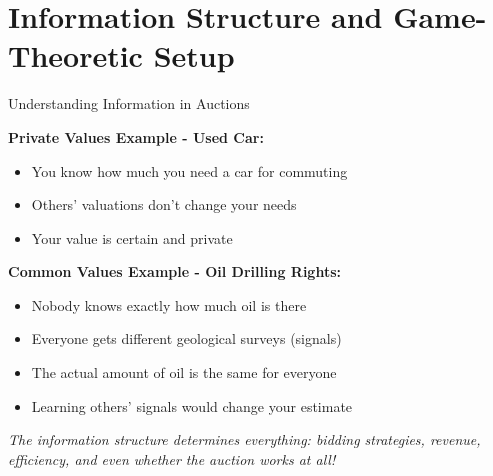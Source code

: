 \documentclass[xcolor={x11names}]{beamer}
\begin{document}
\section{Information Structure and Game-Theoretic Setup}

\begin{frame}{Understanding Information in Auctions}

\textbf{Private Values Example - Used Car:}
\begin{itemize}
  \item You know how much you need a car for commuting
  \item Others' valuations don't change your needs
  \item Your value is certain and private
\end{itemize}

\textbf{Common Values Example - Oil Drilling Rights:}
\begin{itemize}
  \item Nobody knows exactly how much oil is there
  \item Everyone gets different geological surveys (signals)
  \item The actual amount of oil is the same for everyone
  \item Learning others' signals would change your estimate
\end{itemize}

\textit{The information structure determines everything: bidding strategies, revenue, efficiency, and even whether the auction works at all!}
\end{frame}
\end{document}
